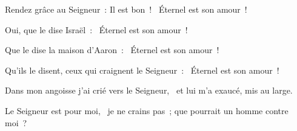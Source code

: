 \begin{psalmus}

Rendez grâce au Seigneur~: Il est bon~!~\grestar{}
Éternel est son amour~!~\Abardot{}

Oui, que le dise Israël~:~\grestar{}
Éternel est son amour~!~\Abardot{}

Que le dise la maison d'Aaron~:~\grestar{}
Éternel est son amour~!~\Abardot{}

Qu'ils le disent, ceux qui craignent le Seigneur~:~\grestar{}
Éternel est son amour~!~\Abardot{}

Dans mon angoisse j'ai crié vers le Seigneur,~\grestar{}
et lui m'a exaucé, mis au large.~\Abardot{}

Le Seigneur est pour moi,~\grestar{}
je ne crains pas~; que pourrait un homme contre moi~?~\Abardot{}
\end{psalmus}

